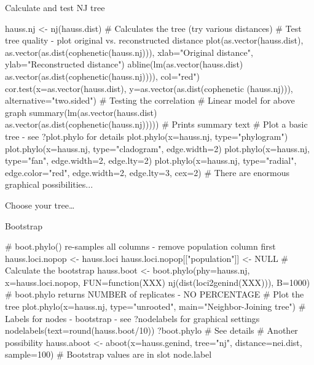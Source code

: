 \documentclass[compress, ucs, xelatex, 11pt, xcolor=svgnames, aspectratio=169,
	hyperref={
		bookmarks=true,
		unicode=true,
		colorlinks=true,
		pdftitle={Molecular data in R},
		plainpages=false,
		pdfauthor={Vojtech Zeisek},
		pdfsubject={Course about phylogeny and evolution in R},
		pdfcreator={XeLaTeX},
		pdfkeywords={R, evolution, phylogeny, molecular data},
		linkcolor=Crimson, %
		anchorcolor=Magenta, %
		citecolor=Magenta, %
		filecolor=Magenta, %
		menucolor=Magenta, %
		urlcolor=DodgerBlue, %
		pdftex},
	url={hyphens, lowtilde} %
	]{beamer}
\renewcommand{\texttt}[1]{\colorbox{Beige}{{\ttfamily #1}}}
\begin{document}
\begin{frame}[fragile]{Calculate and test NJ tree}
	\label{NJ}
	\begin{spluscode}
    hauss.nj <- nj(hauss.dist) # Calculates the tree (try various distances)
    # Test tree quality - plot original vs. reconstructed distance
    plot(as.vector(hauss.dist), as.vector(as.dist(cophenetic(hauss.nj))),
      xlab="Original distance", ylab="Reconstructed distance")
    abline(lm(as.vector(hauss.dist) ~
      as.vector(as.dist(cophenetic(hauss.nj)))), col="red")
    cor.test(x=as.vector(hauss.dist), y=as.vector(as.dist(cophenetic
      (hauss.nj))), alternative="two.sided") # Testing the correlation
    # Linear model for above graph
    summary(lm(as.vector(hauss.dist) ~
      as.vector(as.dist(cophenetic(hauss.nj))))) # Prints summary text
    # Plot a basic tree - see ?plot.phylo for details
    plot.phylo(x=hauss.nj, type="phylogram")
    plot.phylo(x=hauss.nj, type="cladogram", edge.width=2)
    plot.phylo(x=hauss.nj, type="fan", edge.width=2, edge.lty=2)
    plot.phylo(x=hauss.nj, type="radial", edge.color="red", edge.width=2,
      edge.lty=3, cex=2) # There are enormous graphical possibilities...
	\end{spluscode}
\end{frame}

\begin{frame}{Choose your tree\ldots}
	\begin{center}
		\texttt{[image: nj1.png]}
	\end{center}
\end{frame}

\begin{frame}[fragile]{Bootstrap}
	\begin{spluscode}
    # boot.phylo() re-samples all columns - remove population column first
    hauss.loci.nopop <- hauss.loci
    hauss.loci.nopop[["population"]] <- NULL
    # Calculate the bootstrap
    hauss.boot <- boot.phylo(phy=hauss.nj, x=hauss.loci.nopop,
      FUN=function(XXX) nj(dist(loci2genind(XXX))), B=1000)
    # boot.phylo returns NUMBER of replicates - NO PERCENTAGE
    # Plot the tree
    plot.phylo(x=hauss.nj, type="unrooted", main="Neighbor-Joining tree")
    # Labels for nodes - bootstrap - see ?nodelabels for graphical settings
    nodelabels(text=round(hauss.boot/10))
    ?boot.phylo # See details
    # Another possibility
    hauss.aboot <- aboot(x=hauss.genind, tree="nj", distance=nei.dist,
      sample=100) # Bootstrap values are in slot node.label
	\end{spluscode}
\end{frame}
\end{document}
